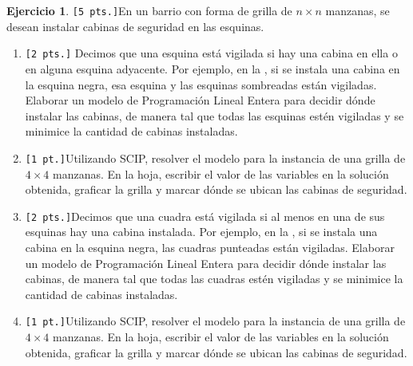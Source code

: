 \documentclass[a4paper,oneside,12pt]{amsart}
\theoremstyle{definition}
\newtheorem{quest}{Ejercicio}
\begin{document}
\begin{quest} 
    \texttt{[5 pts.]}En un barrio con forma de grilla de $n\times n$ manzanas, se desean instalar cabinas de
    seguridad en las
    esquinas.
    \begin{enumerate}[label=\alph*)]
        \item \texttt{[2 pts.]} Decimos que una esquina está vigilada si hay una cabina en ella o en alguna esquina
        adyacente. Por
        ejemplo, en la , si se instala una cabina en la esquina negra, esa esquina y las esquinas
        sombreadas están vigiladas.
        Elaborar un modelo de Programación Lineal Entera para decidir dónde instalar las cabinas, de manera tal que
        todas las esquinas estén vigiladas y se minimice la cantidad de cabinas instaladas.
        \item \texttt{[1 pt.]}Utilizando SCIP, resolver el modelo para la instancia de una grilla de $4\times 4$
        manzanas. En la hoja, escribir el valor de las variables en la solución obtenida, graficar la grilla y marcar
        dónde se ubican las cabinas de seguridad.
        \item \texttt{[2 pts.]}Decimos que una cuadra está vigilada si al menos en una de sus esquinas hay una
        cabina instalada. Por ejemplo, en la , si se instala una cabina en la esquina negra,
        las cuadras punteadas están vigiladas.
        Elaborar un modelo de Programación Lineal Entera para decidir dónde instalar las cabinas, de manera tal que
        todas las cuadras estén vigiladas  y se minimice la cantidad de cabinas instaladas.
        \item \texttt{[1 pt.]}Utilizando SCIP, resolver el modelo para la instancia de una grilla de $4\times 4$
        manzanas. En la hoja, escribir el valor de las variables en la solución obtenida, graficar la grilla y marcar
        dónde se ubican las cabinas de seguridad.
    \end{enumerate}

    \begin{figure}[h!]
        \centering
        \begin{subfigure}[t]{0.48\textwidth}
            \centering
\end{subfigure}
\end{figure}
\end{quest}
\end{document}
